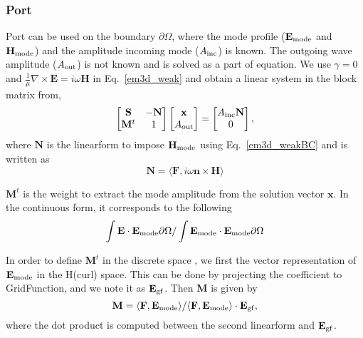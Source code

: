 \documentclass[11pt,a4paper,draft]{report}
\begin{document}
 \subsubsection{Port}
 Port can be used  on the boundary $\partial\Omega$, where the mode profile ($\mathbf{E}_{\rm mode}$ and $\mathbf{H}_{\rm mode}$) and the amplitude incoming mode ($A_{\rm inc}$) is known. The outgoing wave amplitude ($A_{\rm out}$) is not known and is solved as a part of equation. We use $\gamma=0$ and $\frac{1}{\mu}\nabla\times\mathbf{E}=i \omega \mathbf{H}$ in Eq.~\ref{em3d_weak} and obtain a linear system in the block matrix from,
\begin{equation}
\label{port_BC_blockmatrix}
 \begin{bmatrix}
 \mathbf{S}   & -\mathbf{N} \\
\mathbf{M}^t & 1\\
\end{bmatrix}
 \begin{bmatrix}
 \mathbf{x} \\
A_{\rm out}\\
\end{bmatrix}
=
 \begin{bmatrix}
A_{\rm inc} \mathbf{N}     \\
0 \\
\end{bmatrix},
 \end{equation}
where $\mathbf{N}$ is the linearform to impose  $\mathbf{H}_{\rm mode}$ using Eq.~\ref{em3d_weakBC} and is written as
\begin{equation}
\mathbf{N} = \langle \mathbf{F}, i \omega \mathbf{n} \times \mathbf{H}\rangle 
 \end{equation}
 
$\mathbf{M}^t$ is the weight to extract the mode amplitude from the solution vector $\mathbf{x}$. In the continuous form, it corresponds to the following 
\begin{equation}
\int \mathbf{E} \cdot \mathbf{E}_{\rm mode} \partial\Omega/\int \mathbf{E}_{\rm mode}  \cdot \mathbf{E}_{\rm mode} \partial\Omega
\end{equation}

In order to define $\mathbf{M}^t$ in the discrete space , we first the vector representation of $\mathbf{E}_{\rm mode}$ in the H(curl) space. This can be done by projecting the coefficient to GridFunction, and we note it as $\mathbf{E}_{\rm gf}$. Then $\mathbf{M}$ is given by
\begin{equation}
\mathbf{M} = \langle \mathbf{F}, \mathbf{E_{\rm mode}} \rangle / \langle \mathbf{F}, \mathbf{E}_{\rm mode} \rangle \cdot \mathbf{E}_{\rm gf},
 \end{equation}
where the dot product is computed between the second linearform and $\mathbf{E}_{\rm gf}$.
\end{document}
